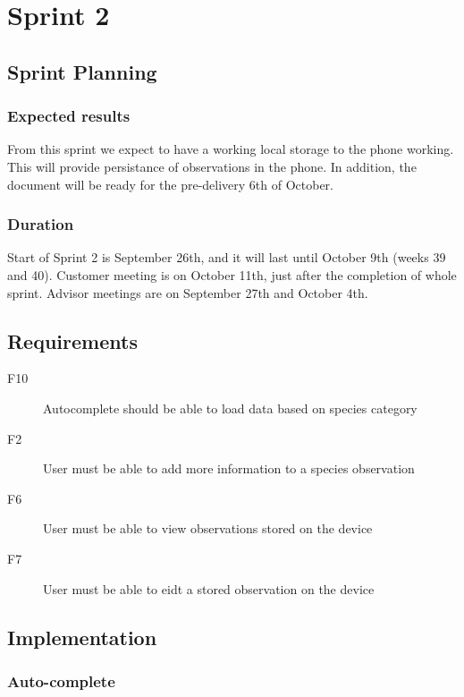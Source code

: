 \section{Sprint 2}

\subsection{Sprint Planning}

	\subsubsection{Expected results}
  From this sprint we expect to have a working local storage to the phone working. This will provide persistance of observations in the phone. In addition, the document will be ready for the pre-delivery 6th of October.
	
	\subsubsection{Duration}
	Start of Sprint 2 is September 26th, and it will last until October 9th (weeks 39 and 40). Customer meeting is on October 11th, just after the completion of whole sprint. Advisor meetings are on September 27th and October 4th.

\subsection{Requirements}

\begin{description}
	\item[F10] Autocomplete should be able to load data based on species category
	\item[F2] User must be able to add more information to a species observation
	\item[F6] User must be able to view observations stored on the device
	\item[F7] User must be able to eidt a stored observation on the device
\end{description}

\subsection{Implementation}


	\subsubsection{Auto-complete}

